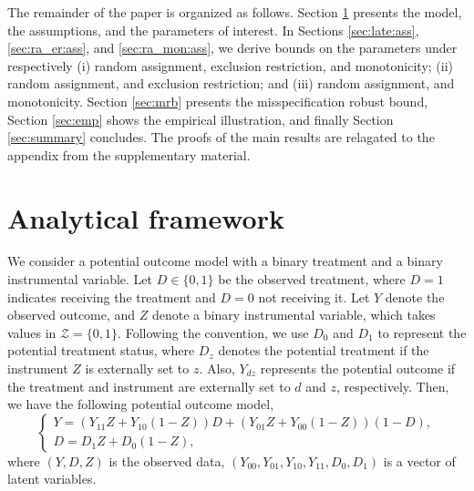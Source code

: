 \documentclass[12pt]{article}
\theoremstyle{plain}
\theoremstyle{definition}
\theoremstyle{remark}
\begin{document}
The remainder of the paper is organized as follows. Section \ref{analy} presents the model, the assumptions, and the parameters of interest. In Sections \ref{sec:late:ass}, \ref{sec:ra_er:ass}, and \ref{sec:ra_mon:ass}, we derive bounds on the parameters under respectively (i) random assignment, exclusion restriction, and monotonicity; (ii) random assignment, and exclusion restriction; and (iii) random assignment, and monotonicity. Section \ref{sec:mrb} presents the misspecification robust bound, Section \ref{sec:emp} shows the empirical illustration, and finally Section \ref{sec:summary} concludes. The proofs of the main results are relagated to the appendix from the supplementary material.    

\section{Analytical framework}\label{analy}
We consider a potential outcome model with a binary treatment and a binary instrumental variable. Let $D \in \{0, 1\}$ be the observed treatment, where $D = 1$ indicates receiving the treatment and $D = 0$ not receiving it. Let $Y$ denote the observed outcome, and $Z$ denote a binary instrumental variable, which takes values in $\mathcal{Z} = \{0, 1\}$. Following the convention, we use $D_0$ and $D_1$ to represent the potential treatment status, where $D_z$ denotes the potential treatment if the instrument $Z$ is externally set to $z$. Also, $Y_{dz}$ represents the potential outcome if the treatment and instrument are externally set to $d$ and $z$, respectively. Then, we have the following potential outcome model,
\begin{equation} \label{eq:basic_model}
    \left\{\begin{array}{l}
        Y = \left(Y_{11}Z + Y_{10}(1 - Z)\right) D + \left(Y_{01}Z + Y_{00}(1 - Z)\right) (1 - D), \\
        D = D_1 Z + D_0 (1 - Z),
        \end{array}\right.
\end{equation}
where $(Y, D, Z)$ is the observed data, $\left(Y_{00}, Y_{01}, Y_{10}, Y_{11}, D_0, D_1\right)$ is a vector of latent variables. %
\end{document}
